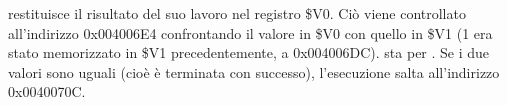 \scanf restituisce il risultato del suo lavoro nel registro \$V0. Ciò viene controllato all'indirizzo 0x004006E4
confrontando il valore in \$V0 con quello in \$V1 (1 era stato memorizzato in \$V1 precedentemente, a 0x004006DC).
 sta per .
Se i due valori sono uguali (cioè \scanf è terminata con successo), l'esecuzione salta all'indirizzo 0x0040070C.

